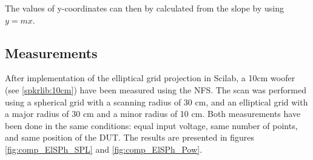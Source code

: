 \documentclass{report}
\begin{document}
The values of y-coordinates can then by calculated from the slope by using $y = mx$. 

\subsection{Measurements}

After implementation of the elliptical grid projection in Scilab, a 10cm woofer (see \ref{spkrlib:10cm}) have been measured using the NFS. The scan was performed using a spherical grid with a scanning radius of 30 cm, and an elliptical grid with a major radius of 30 cm and a minor radius of 10 cm. Both measurements have been done in the same conditions: equal input voltage, same number of points, and same position of the DUT. The results are presented in figures \ref{fig:comp_ElSPh_SPL} and \ref{fig:comp_ElSPh_Pow}. \\
\end{document}
